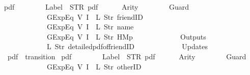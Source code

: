 \begin{isabellebody}
{\isachardoublequoteopen}pdf\ {\isasymequiv}\ {\isasymlparr}\isanewline
\ \ \ \ \ \ Label\ {\isacharequal}\ STR\ {\isacharprime}{\isacharprime}pdf{\isacharprime}{\isacharprime}{\isacharcomma}\isanewline
\ \ \ \ \ \ Arity\ {\isacharequal}\ {}{\isacharcomma}\isanewline
\ \ \ \ \ \ Guard\ {\isacharequal}\ {\isacharbrackleft}\isanewline
\ \ \ \ \ \ \ \ \ \ \ \ GExp{\isachardot}Eq\ {\isacharparenleft}V\ {\isacharparenleft}I\ {}{\isacharparenright}{\isacharparenright}\ {\isacharparenleft}L\ {\isacharparenleft}Str\ {\isacharprime}{\isacharprime}friendID{\isacharprime}{\isacharprime}{\isacharparenright}{\isacharparenright}{\isacharcomma}\isanewline
\ \ \ \ \ \ \ \ \ \ \ \ GExp{\isachardot}Eq\ {\isacharparenleft}V\ {\isacharparenleft}I\ {}{\isacharparenright}{\isacharparenright}\ {\isacharparenleft}L\ {\isacharparenleft}Str\ {\isacharprime}{\isacharprime}name{\isacharprime}{\isacharprime}{\isacharparenright}{\isacharparenright}{\isacharcomma}\isanewline
\ \ \ \ \ \ \ \ \ \ \ \ GExp{\isachardot}Eq\ {\isacharparenleft}V\ {\isacharparenleft}I\ {}{\isacharparenright}{\isacharparenright}\ {\isacharparenleft}L\ {\isacharparenleft}Str\ {\isacharprime}{\isacharprime}HM{}p{\isacharprime}{\isacharprime}{\isacharparenright}{\isacharparenright}\isanewline
\ \ \ \ \ \ {\isacharbrackright}{\isacharcomma}\isanewline
\ \ \ \ \ \ Outputs\ {\isacharequal}\ {\isacharbrackleft}\isanewline
\ \ \ \ \ \ \ \ \ \ \ \ {\isacharparenleft}L\ {\isacharparenleft}Str\ {\isacharprime}{\isacharprime}detailed{\isacharunderscore}pdf{\isacharunderscore}of{\isacharunderscore}friendID{\isacharprime}{\isacharprime}{\isacharparenright}{\isacharparenright}\isanewline
\ \ \ \ \ \ {\isacharbrackright}{\isacharcomma}\isanewline
\ \ \ \ \ \ Updates\ {\isacharequal}\ {\isacharbrackleft}{\isacharbrackright}\isanewline
{\isasymrparr}{\isachardoublequoteclose}\isanewline
\isanewline
{}\isamarkupfalse%
\ {\isachardoublequoteopen}pdf{}{\isachardoublequoteclose}\ {\isacharcolon}{\isacharcolon}\ {\isachardoublequoteopen}transition{\isachardoublequoteclose}\ \isanewline
{\isachardoublequoteopen}pdf{}\ {\isasymequiv}\ {\isasymlparr}\isanewline
\ \ \ \ \ \ Label\ {\isacharequal}\ STR\ {\isacharprime}{\isacharprime}pdf{\isacharprime}{\isacharprime}{\isacharcomma}\isanewline
\ \ \ \ \ \ Arity\ {\isacharequal}\ {}{\isacharcomma}\isanewline
\ \ \ \ \ \ Guard\ {\isacharequal}\ {\isacharbrackleft}\isanewline
\ \ \ \ \ \ \ \ \ \ \ \ GExp{\isachardot}Eq\ {\isacharparenleft}V\ {\isacharparenleft}I\ {}{\isacharparenright}{\isacharparenright}\ {\isacharparenleft}L\ {\isacharparenleft}Str\ {\isacharprime}{\isacharprime}otherID{\isacharprime}{\isacharprime}{\isacharparenright}{\isacharparenright}{\isacharcomma}\isanewline

\end{isabellebody}
